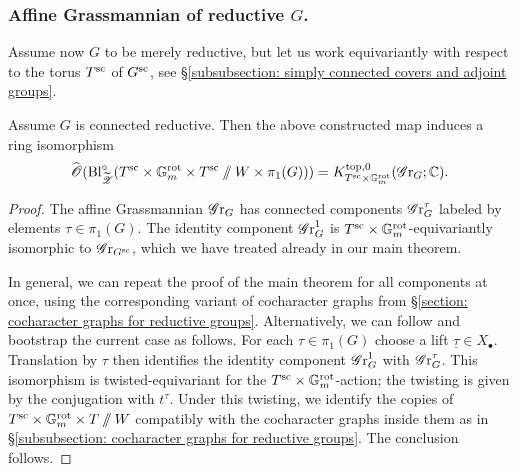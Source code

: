\subsubsection{Affine Grassmannian of reductive $G$.}
Assume now $G$ to be merely reductive, but let us work equivariantly with respect to the torus $T^{\sc}$ of $G^{\sc}$, see \S \ref{subsubsection: simply connected covers and adjoint groups}.

\begin{lemma}\label{lemma: equivariant K-theory as deformation to normal cone -- G reductive}
Assume $G$ is connected reductive. Then the above constructed map induces a ring isomorphism
\begin{equation*}
   \widehat{\O}(\Bl^{\circ}_{\widetilde{\eZ}}(T^{\sc} \times \Gm^{\rot} \times T^{\sc}\sslash W \times \pi_1(G))) 
   = K^{\top, 0}_{T^{\sc} \times \Gm^{\rot}}(\Gr_G; \C).
\end{equation*}
\end{lemma}
\begin{proof}
The affine Grassmannian $\Gr_G$ has connected components $\Gr^{\tau}_G$ labeled by elements $\tau \in \pi_1(G)$. The identity component $\Gr^1_G$ is $T^{\sc} \times \Gm^{\rot}$-equivariantly isomorphic to $\Gr_{G^{\sc}}$, which we have treated already in our main theorem.

In general, we can repeat the proof of the main theorem for all components at once, using the corresponding variant of cocharacter graphs from \S \ref{section: cocharacter graphs for reductive groups}. Alternatively, we can follow \cite{BF07} and bootstrap the current case as follows. For each $\tau \in \pi_1(G)$ choose a lift $\underline{\tau} \in X_{\bullet}$. Translation by $\tau$ then identifies the identity component $\Gr^1_G$ with $\Gr^{\tau}_G$. This isomorphism is twisted-equivariant for the $T^{\sc} \times \Gm^{\rot}$-action; the twisting is given by the conjugation with $t^\tau$. Under this twisting, we identify the copies of $T^{\sc} \times \Gm^{\rot} \times T \sslash W$ compatibly with the cocharacter graphs inside them as in \S \ref{subsubsection: cocharacter graphs for reductive groups}. The conclusion follows.
\end{proof}






